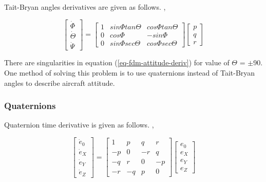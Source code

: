 Tait-Bryan angles derivatives are given as follows. \cite{Sibilski2004}, \cite{Allerton2009}

\begin{equation}
  \label{eq-fdm-attitude-deriv}
  \left[
    \begin{matrix}
      \dot \Phi \\
      \dot \Theta \\
      \dot \Psi
    \end{matrix}
  \right]
  =
  \left[
    \begin{matrix}
      1 & sin\Phi tan\Theta & cos\Phi tan\Theta \\
      0 & cos\Phi & -sin\Phi \\
      0 & sin\Phi sec\Theta & cos\Phi sec\Theta
    \end{matrix}
  \right]
  \left[
    \begin{matrix}
      p \\
      q \\
      r
    \end{matrix}
  \right]
\end{equation}

There are singularities in equation (\ref{eq-fdm-attitude-deriv}) for value of $\Theta$ = $\pm$90\degree . One method of solving this problem is to use quaternions instead of Tait-Bryan angles to describe aircraft attitude.

\subsubsection{Quaternions}

Quaternion time derivative is given as follows. \cite{Sibilski2004}, \cite{StevensLewis1992}

\begin{equation}
  \label{eq-fdm-quaternion-deriv}
  \left[
    \begin{matrix}
      \dot e_0 \\
      \dot e_X \\
      \dot e_Y \\
      \dot e_Z
    \end{matrix}
  \right]
  =
  \left[
    \begin{matrix}
       1 &  p &  q &  r \\
      -p &  0 & -r &  q \\
      -q &  r &  0 & -p \\
      -r & -q &  p &  0
    \end{matrix}
  \right]
  \left[
    \begin{matrix}
      e_0 \\
      e_X \\
      e_Y \\
      e_Z
    \end{matrix}
  \right]
\end{equation}

